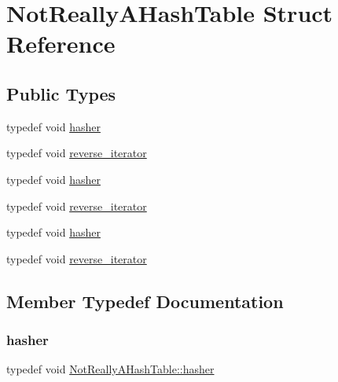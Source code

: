 \hypertarget{struct_not_really_a_hash_table}{}\section{Not\+Really\+A\+Hash\+Table Struct Reference}
\label{struct_not_really_a_hash_table}
\subsection*{Public Types}
\begin{DoxyCompactItemize}
\item 
typedef void \mbox{\hyperlink{struct_not_really_a_hash_table_a0206bef6150919c8ba5d539d5bf555f7}{hasher}}
\item 
typedef void \mbox{\hyperlink{struct_not_really_a_hash_table_a8dbee2a2a80768191c736fb57367cfe7}{reverse\+\_\+iterator}}
\item 
typedef void \mbox{\hyperlink{struct_not_really_a_hash_table_a0206bef6150919c8ba5d539d5bf555f7}{hasher}}
\item 
typedef void \mbox{\hyperlink{struct_not_really_a_hash_table_a8dbee2a2a80768191c736fb57367cfe7}{reverse\+\_\+iterator}}
\item 
typedef void \mbox{\hyperlink{struct_not_really_a_hash_table_a0206bef6150919c8ba5d539d5bf555f7}{hasher}}
\item 
typedef void \mbox{\hyperlink{struct_not_really_a_hash_table_a8dbee2a2a80768191c736fb57367cfe7}{reverse\+\_\+iterator}}
\end{DoxyCompactItemize}


\subsection{Member Typedef Documentation}
\mbox{\label{struct_not_really_a_hash_table_a0206bef6150919c8ba5d539d5bf555f7}} 
\subsubsection{\texorpdfstring{hasher}{hasher}\hspace{0.1cm}{\footnotesize\ttfamily [1/3]}}
{\footnotesize\ttfamily typedef void \mbox{\hyperlink{struct_not_really_a_hash_table_a0206bef6150919c8ba5d539d5bf555f7}{Not\+Really\+A\+Hash\+Table\+::hasher}}}

